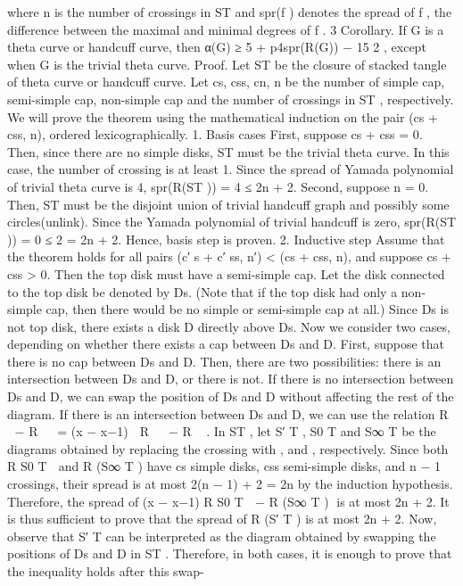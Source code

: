 where n is the number of crossings in ST and spr(f ) denotes the spread of f , the difference between the maximal
and minimal degrees of f .
3
Corollary. If G is a theta curve or handcuff curve, then
α(G) ≥ 5 + p4spr(R(G)) − 15
2 ,
except when G is the trivial theta curve.
Proof. Let ST be the closure of stacked tangle of theta curve or handcuff curve. Let cs, css, cn, n be the number
of simple cap, semi-simple cap, non-simple cap and the number of crossings in ST , respectively. We will prove the
theorem using the mathematical induction on the pair (cs + css, n), ordered lexicographically.
1. Basis cases
First, suppose cs + css = 0. Then, since there are no simple disks, ST must be the trivial theta curve. In this
case, the number of crossing is at least 1. Since the spread of Yamada polynomial of trivial theta curve is 4,
spr(R(ST )) = 4 ≤ 2n + 2.
Second, suppose n = 0. Then, ST must be the disjoint union of trivial handcuff graph and possibly some
circles(unlink). Since the Yamada polynomial of trivial handcuff is zero, spr(R(ST )) = 0 ≤ 2 = 2n + 2.
Hence, basis step is proven.
2. Inductive step
Assume that the theorem holds for all pairs (c′
s + c′
ss, n′) < (cs + css, n), and suppose cs + css > 0. Then the
top disk must have a semi-simple cap. Let the disk connected to the top disk be denoted by Ds. (Note that
if the top disk had only a non-simple cap, then there would be no simple or semi-simple cap at all.) Since Ds
is not top disk, there exists a disk D directly above Ds. Now we consider two cases, depending on whether
there exists a cap between Ds and D. First, suppose that there is no cap between Ds and D. Then, there are
two possibilities: there is an intersection between Ds and D, or there is not.
If there is no intersection between Ds and D, we can swap the position of Ds and D without affecting the
rest of the diagram. If there is an intersection between Ds and D, we can use the relation
R
 
− R
 
= (x − x−1)

R
 
− R
 
.
In ST , let S′
T , S0
T and S∞
T be the diagrams obtained by replacing the crossing with , and
, respectively. Since both R S0
T
 and R (S∞
T ) have cs simple disks, css semi-simple disks, and n − 1
crossings, their spread is at most 2(n − 1) + 2 = 2n by the induction hypothesis. Therefore, the spread of
(x − x−1) R S0
T
 − R (S∞
T ) is at most 2n + 2. It is thus sufficient to prove that the spread of R (S′
T ) is at
most 2n + 2. Now, observe that S′
T can be interpreted as the diagram obtained by swapping the positions
of Ds and D in ST . Therefore, in both cases, it is enough to prove that the inequality holds after this swap-
